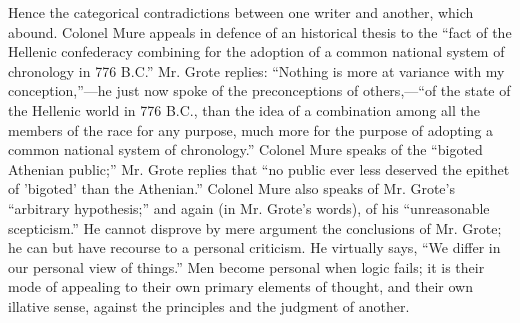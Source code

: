 Hence the categorical contradictions between one writer and
another, which abound. Colonel Mure appeals in defence of an
historical thesis to the ``fact of the Hellenic confederacy
combining for the adoption of a common national system of chronology
in 776 B.C.'' Mr. Grote replies: ``Nothing is more at variance
with my conception,''—he just now spoke of the preconceptions of
others,—``of the state of the Hellenic world in 776 B.C., than
the idea of a combination among all the members of the race for any
purpose, much more for the purpose of adopting a common national
system of chronology.'' Colonel Mure speaks of the ``bigoted
Athenian public;'' Mr. Grote replies that ``no public ever
less deserved the epithet of 'bigoted' than the Athenian.''
Colonel Mure also speaks of Mr. Grote's ``arbitrary
hypothesis;'' and again (in Mr. Grote's words), of his
``unreasonable scepticism.'' He cannot disprove by mere
argument the conclusions of Mr. Grote; he can but have recourse to a
personal criticism. He virtually says, ``We differ in our personal
view of things.'' Men become personal when logic fails; it is
their mode of appealing to their own primary elements of thought, and
their own illative sense, against the principles and the judgment of
another.

